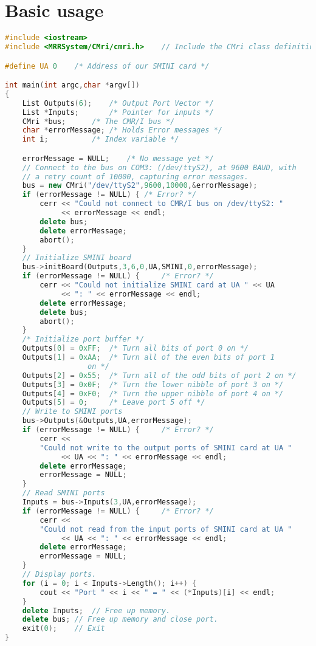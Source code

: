 \section{Basic usage}
\begin{lstlisting}[caption={Using the CMR/I from C++},
		   language=C++,
		   label=lst:CMRI:Cpp1]
#include <iostream>
#include <MRRSystem/CMri/cmri.h>	// Include the CMri class definition

#define UA 0	/* Address of our SMINI card */

int main(int argc,char *argv[])
{
	List Outputs(6);	/* Output Port Vector */
	List *Inputs;		/* Pointer for inputs */
	CMri *bus;		/* The CMR/I bus */
	char *errorMessage;	/* Holds Error messages */
	int i;			/* Index variable */

	errorMessage = NULL;	/* No message yet */
	// Connect to the bus on COM3: (/dev/ttyS2), at 9600 BAUD, with
	// a retry count of 10000, capturing error messages.
	bus = new CMri("/dev/ttyS2",9600,10000,&errorMessage);
	if (errorMessage != NULL) {	/* Error? */
		cerr << "Could not connect to CMR/I bus on /dev/ttyS2: " 
		     << errorMessage << endl;
		delete bus;
		delete errorMessage;
		abort();
	}
	// Initialize SMINI board
	bus->initBoard(Outputs,3,6,0,UA,SMINI,0,errorMessage);
	if (errorMessage != NULL) {     /* Error? */  
		cerr << "Could not initialize SMINI card at UA " << UA
		     << ": " << errorMessage << endl;
		delete errorMessage;
		delete bus;
		abort();
	}
	/* Initialize port buffer */
	Outputs[0] = 0xFF;	/* Turn all bits of port 0 on */
	Outputs[1] = 0xAA;	/* Turn all of the even bits of port 1
				   on */
	Outputs[2] = 0x55;	/* Turn all of the odd bits of port 2 on */
	Outputs[3] = 0x0F;	/* Turn the lower nibble of port 3 on */
	Outputs[4] = 0xF0;	/* Turn the upper nibble of port 4 on */
	Outputs[5] = 0;		/* Leave port 5 off */
	// Write to SMINI ports
	bus->Outputs(&Outputs,UA,errorMessage);
	if (errorMessage != NULL) {     /* Error? */
		cerr << 
		"Could not write to the output ports of SMINI card at UA " 
		     << UA << ": " << errorMessage << endl;
		delete errorMessage;
		errorMessage = NULL;
	}
	// Read SMINI ports
	Inputs = bus->Inputs(3,UA,errorMessage);
	if (errorMessage != NULL) {     /* Error? */
		cerr <<
		"Could not read from the input ports of SMINI card at UA "
		     << UA << ": " << errorMessage << endl;
		delete errorMessage;
		errorMessage = NULL;
	}
	// Display ports.
	for (i = 0; i < Inputs->Length(); i++) {
		cout << "Port " << i << " = " << (*Inputs)[i] << endl;
	}
	delete Inputs; 	// Free up memory.
	delete bus;	// Free up memory and close port.
	exit(0);	// Exit
}
\end{lstlisting}
